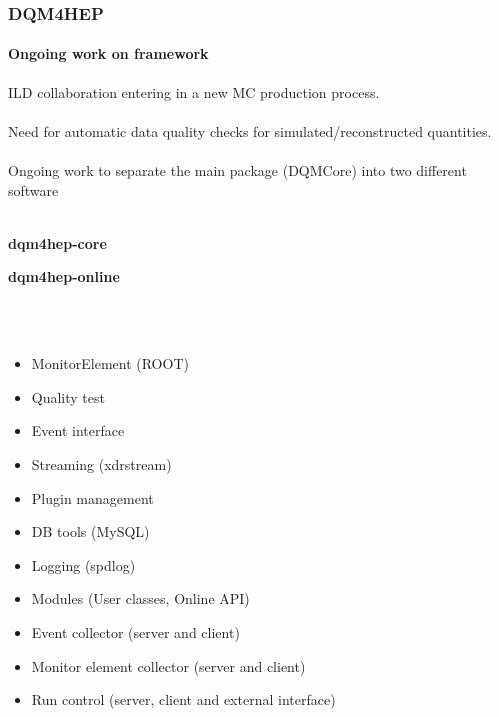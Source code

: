 \documentclass[presentation, 10pt]{beamer}
\begin{document}
\begin{frame}
  \frametitle{DQM4HEP}
  \framesubtitle{Ongoing work on framework}
  \footnotesize
  ILD collaboration entering in a new MC production process. \\
  ~ \\
  Need for automatic data quality checks for simulated/reconstructed quantities. \\
  ~ \\
  Ongoing work to separate the main package (DQMCore) into two different software \\
  ~\\
  \begin{minipage}{0.49\linewidth}
    \textbf{dqm4hep-core}
  \end{minipage}
  \begin{minipage}{0.49\linewidth}
    \textbf{dqm4hep-online}
  \end{minipage} \\
  ~ \\
  \begin{minipage}{0.49\linewidth}
    \begin{itemize}
      \scriptsize
      \item MonitorElement (ROOT)
      \item Quality test
      \item Event interface
      \item Streaming (xdrstream)
      \item Plugin management
      \item DB tools (MySQL)
      \item Logging (spdlog)
    \end{itemize}
  \end{minipage}
  \begin{minipage}{0.49\linewidth}
    \begin{itemize}
      \scriptsize
      \item Modules (User classes, Online API)
      \item Event collector (server and client)
      \item Monitor element collector (server and client)
      \item Run control (server, client and external interface)
    \end{itemize}
  \end{minipage}
\end{frame}
\end{document}
